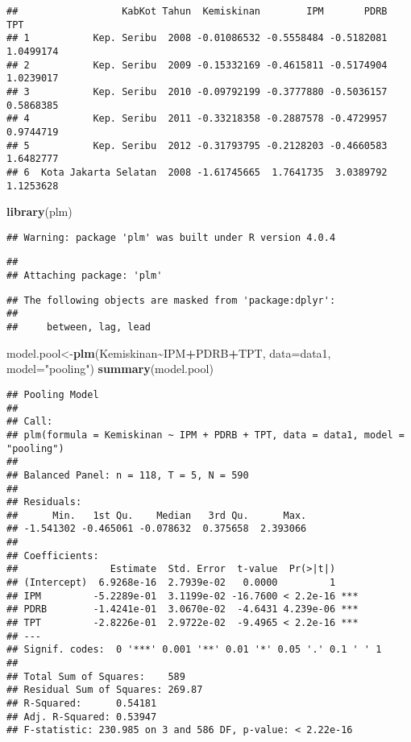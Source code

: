 \documentclass[
]{book}
\newenvironment{Shaded}{\begin{snugshade}}{\end{snugshade}}
\newcommand{\DataTypeTok}[1]{\textcolor[rgb]{0.13,0.29,0.53}{#1}}
\newcommand{\KeywordTok}[1]{\textcolor[rgb]{0.13,0.29,0.53}{\textbf{#1}}}
\newcommand{\NormalTok}[1]{#1}
\newcommand{\OperatorTok}[1]{\textcolor[rgb]{0.81,0.36,0.00}{\textbf{#1}}}
\newcommand{\StringTok}[1]{\textcolor[rgb]{0.31,0.60,0.02}{#1}}
\begin{document}
\begin{verbatim}
##                  KabKot Tahun  Kemiskinan        IPM       PDRB       TPT
## 1           Kep. Seribu  2008 -0.01086532 -0.5558484 -0.5182081 1.0499174
## 2           Kep. Seribu  2009 -0.15332169 -0.4615811 -0.5174904 1.0239017
## 3           Kep. Seribu  2010 -0.09792199 -0.3777880 -0.5036157 0.5868385
## 4           Kep. Seribu  2011 -0.33218358 -0.2887578 -0.4729957 0.9744719
## 5           Kep. Seribu  2012 -0.31793795 -0.2128203 -0.4660583 1.6482777
## 6  Kota Jakarta Selatan  2008 -1.61745665  1.7641735  3.0389792 1.1253628
\end{verbatim}

\begin{Shaded}
\begin{Highlighting}[]
\KeywordTok{library}\NormalTok{(plm)}
\end{Highlighting}
\end{Shaded}

\begin{verbatim}
## Warning: package 'plm' was built under R version 4.0.4
\end{verbatim}

\begin{verbatim}
## 
## Attaching package: 'plm'
\end{verbatim}

\begin{verbatim}
## The following objects are masked from 'package:dplyr':
## 
##     between, lag, lead
\end{verbatim}

\begin{Shaded}
\begin{Highlighting}[]
\NormalTok{model.pool\textless{}{-}}\KeywordTok{plm}\NormalTok{(Kemiskinan}\OperatorTok{\textasciitilde{}}\NormalTok{IPM}\OperatorTok{+}\NormalTok{PDRB}\OperatorTok{+}\NormalTok{TPT, }\DataTypeTok{data=}\NormalTok{data1, }\DataTypeTok{model=}\StringTok{"pooling"}\NormalTok{)}
\KeywordTok{summary}\NormalTok{(model.pool)}
\end{Highlighting}
\end{Shaded}

\begin{verbatim}
## Pooling Model
## 
## Call:
## plm(formula = Kemiskinan ~ IPM + PDRB + TPT, data = data1, model = "pooling")
## 
## Balanced Panel: n = 118, T = 5, N = 590
## 
## Residuals:
##      Min.   1st Qu.    Median   3rd Qu.      Max. 
## -1.541302 -0.465061 -0.078632  0.375658  2.393066 
## 
## Coefficients:
##                Estimate  Std. Error  t-value  Pr(>|t|)    
## (Intercept)  6.9268e-16  2.7939e-02   0.0000         1    
## IPM         -5.2289e-01  3.1199e-02 -16.7600 < 2.2e-16 ***
## PDRB        -1.4241e-01  3.0670e-02  -4.6431 4.239e-06 ***
## TPT         -2.8226e-01  2.9722e-02  -9.4965 < 2.2e-16 ***
## ---
## Signif. codes:  0 '***' 0.001 '**' 0.01 '*' 0.05 '.' 0.1 ' ' 1
## 
## Total Sum of Squares:    589
## Residual Sum of Squares: 269.87
## R-Squared:      0.54181
## Adj. R-Squared: 0.53947
## F-statistic: 230.985 on 3 and 586 DF, p-value: < 2.22e-16
\end{verbatim}
\end{document}
